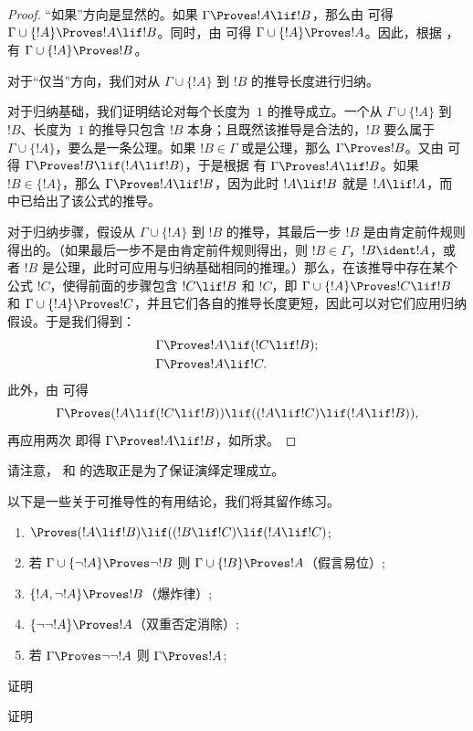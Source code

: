 \documentclass[../../../include/open-logic-section]{subfiles}
\begin{document}
\begin{proof}
“如果”方向是显然的。如果 $\Gamma \Proves !A \lif !B$，那么由
 可得 $\Gamma \cup \{!A\} \Proves !A \lif !B$。同时，由
 可得 $\Gamma \cup \{!A\} \Proves !A$。因此，根据 ，有 $\Gamma \cup
\{!A\} \Proves !B$。

对于“仅当”方向，我们对从 $\Gamma \cup \{!A\}$ 到 $!B$ 的推导长度进行归纳。

对于归纳基础，我们证明结论对每个长度为~$1$ 的推导成立。一个从 $\Gamma \cup \{!A\}$ 到 $!B$、长度为~$1$ 的推导只包含 $!B$ 本身；且既然该推导是合法的，$!B$ 要么属于 $\Gamma \cup \{!A\}$，要么是一条公理。如果 $!B \in \Gamma$ 或是公理，那么 $\Gamma \Proves !B$。又由  可得 $\Gamma
\Proves !B \lif (!A \lif !B)$，于是根据  有 $\Gamma \Proves !A \lif !B$。如果 $!B \in \{ !A\}$，那么 $\Gamma \Proves !A \lif !B$，因为此时 $!A \lif !B$ 就是 $!A \lif !A$，而  中已给出了该公式的推导。

对于归纳步骤，假设从 $\Gamma \cup \{!A\}$ 到 $!B$ 的推导，其最后一步 $!B$ 是由肯定前件规则得出的。（如果最后一步不是由肯定前件规则得出，则 $!B \in \Gamma$，$!B \ident !A$，或者 $!B$ 是公理，此时可应用与归纳基础相同的推理。）那么，在该推导中存在某个公式 $!C$，使得前面的步骤包含 $!C \lif !B$ 和 $!C$，即 $\Gamma \cup \{!A\} \Proves !C \lif !B$ 和 $\Gamma \cup \{!A\}
\Proves !C$，并且它们各自的推导长度更短，因此可以对它们应用归纳假设。于是我们得到：
\begin{align*}
  & \Gamma \Proves !A \lif (!C \lif !B); \\
  & \Gamma \Proves !A \lif !C.
\end{align*}
此外，由  可得
\[
\Gamma \Proves (!A \lif (!C \lif !B)) \lif
((!A\lif !C)  \lif (!A \lif !B)),
\]
再应用两次  即得 $\Gamma \Proves !A \lif !B$，如所求。
\end{proof}

请注意， 和  的选取正是为了保证演绎定理成立。

以下是一些关于可推导性的有用结论，我们将其留作练习。

\begin{prop}
\begin{enumerate}
\item $\Proves (!A \lif !B) \lif ((!B \lif !C)
  \lif (!A \lif !C)$; 
\item 若 $\Gamma \cup \{ \lnot !A\}
  \Proves \lnot !B$ 则 $\Gamma \cup \{ !B\} \Proves
  !A$（假言易位）; 
\item  $\{ !A, \lnot!A\} \Proves
    !B$（爆炸律）; 
\item  $\{ \lnot\lnot!A\} \Proves
  !A$（双重否定消除）;
\item 若 $\Gamma \Proves \lnot\lnot!A$ 则 $\Gamma \Proves
  !A$;
\end{enumerate}
\end{prop}

\begin{prob}
  证明 
\end{prob}
\tagendprob

\begin{prob}
  证明 
\end{prob}
\tagendprob
\end{document}
